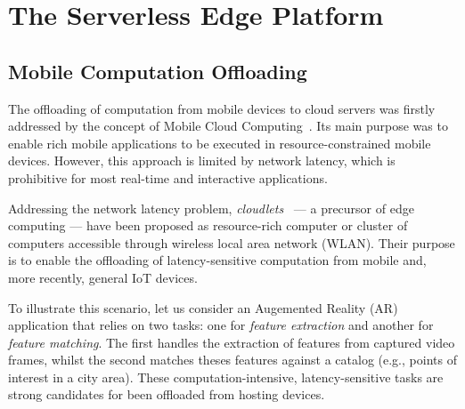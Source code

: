 \documentclass[letterpaper, 10 pt, conference]{ieeeconf}  %
\begin{document}
\section{The Serverless Edge Platform}\label{sec:SEP}

\subsection{Mobile Computation Offloading}\label{sec:SEP_MCO}

The offloading of computation from mobile devices to cloud servers was firstly addressed by the concept of Mobile Cloud Computing~\cite{Khan:14}. Its main purpose was to enable rich mobile applications to be executed in resource-constrained mobile devices. However, this approach is limited by network latency, which is prohibitive for most real-time and interactive applications.

Addressing the network latency problem, \textit{cloudlets}~\cite{Satyanarayanan:2009} --- a precursor of edge computing --- have been proposed as resource-rich computer or cluster of computers  accessible through wireless local area network (WLAN). Their purpose is to enable the offloading of latency-sensitive computation from mobile and, more recently, general IoT devices. 


To illustrate this scenario, let us consider an Augemented Reality (AR) application that relies on two tasks: one for \textit{feature extraction} and another for \textit{feature matching}. The first handles the extraction of features from captured video frames, whilst the second matches theses features against a catalog (e.g., points of interest in a city area). 
These computation-intensive, latency-sensitive tasks are strong candidates for been offloaded from hosting devices.
\end{document}
